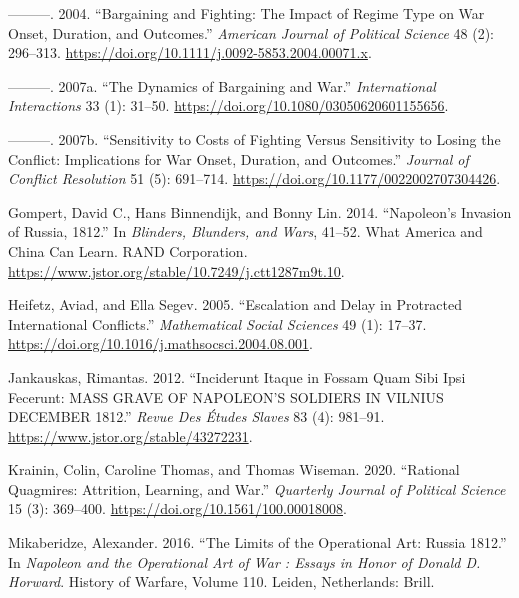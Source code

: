 \documentclass[
  12pt,
]{article}
\newlength{\cslhangindent}
\newenvironment{CSLReferences}[2] %
 {\begin{list}{}{%
  \setlength{\itemindent}{0pt}
  \setlength{\leftmargin}{0pt}
  \setlength{\parsep}{0pt}
  \ifodd #1
   \setlength{\leftmargin}{\cslhangindent}
   \setlength{\itemindent}{-1\cslhangindent}
  \fi
  \setlength{\itemsep}{#2\baselineskip}}}
 {\end{list}}
\theoremstyle{plain}
\theoremstyle{plain}
\theoremstyle{remark}
\begin{document}
\begin{CSLReferences}{1}{0}
---------. 2004. {``Bargaining and {Fighting}: {The Impact} of {Regime
Type} on {War Onset}, {Duration}, and {Outcomes}.''} \emph{American
Journal of Political Science} 48 (2): 296--313.
\url{https://doi.org/10.1111/j.0092-5853.2004.00071.x}.

---------. 2007a. {``The {Dynamics} of {Bargaining} and {War}.''}
\emph{International Interactions} 33 (1): 31--50.
\url{https://doi.org/10.1080/03050620601155656}.

---------. 2007b. {``Sensitivity to {Costs} of {Fighting} Versus
{Sensitivity} to {Losing} the {Conflict}: {Implications} for {War
Onset}, {Duration}, and {Outcomes}.''} \emph{Journal of Conflict
Resolution} 51 (5): 691--714.
\url{https://doi.org/10.1177/0022002707304426}.

Gompert, David C., Hans Binnendijk, and Bonny Lin. 2014. {``Napoleon's
{Invasion} of {Russia}, 1812.''} In \emph{Blinders, {Blunders}, and
{Wars}}, 41--52. What {America} and {China Can Learn}. RAND Corporation.
\url{https://www.jstor.org/stable/10.7249/j.ctt1287m9t.10}.

Heifetz, Aviad, and Ella Segev. 2005. {``Escalation and Delay in
Protracted International Conflicts.''} \emph{Mathematical Social
Sciences} 49 (1): 17--37.
\url{https://doi.org/10.1016/j.mathsocsci.2004.08.001}.

Jankauskas, Rimantas. 2012. {``Inciderunt Itaque in Fossam Quam Sibi
Ipsi Fecerunt: {MASS GRAVE OF NAPOLEON}'{S SOLDIERS IN VILNIUS DECEMBER}
1812.''} \emph{Revue Des Études Slaves} 83 (4): 981--91.
\url{https://www.jstor.org/stable/43272231}.

Krainin, Colin, Caroline Thomas, and Thomas Wiseman. 2020. {``Rational
{Quagmires}: {Attrition}, {Learning}, and {War}.''} \emph{Quarterly
Journal of Political Science} 15 (3): 369--400.
\url{https://doi.org/10.1561/100.00018008}.

Mikaberidze, Alexander. 2016. {``The {Limits} of the {Operational Art}:
{Russia} 1812.''} In \emph{Napoleon and the Operational Art of War :
Essays in Honor of {Donald D}. {Horward}}. History of {Warfare},
{Volume} 110. Leiden, Netherlands: Brill.


\end{CSLReferences}
\end{document}
